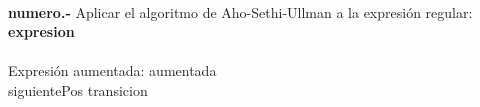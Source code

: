 \paragraph{}
\textbf{{numero}.-} Aplicar el algoritmo de Aho-Sethi-Ullman a la expresión regular: \textbf{{expresion}} \\
\\
Expresión aumentada: {aumentada} \\

{siguientePos}
\quad
{transicion}
